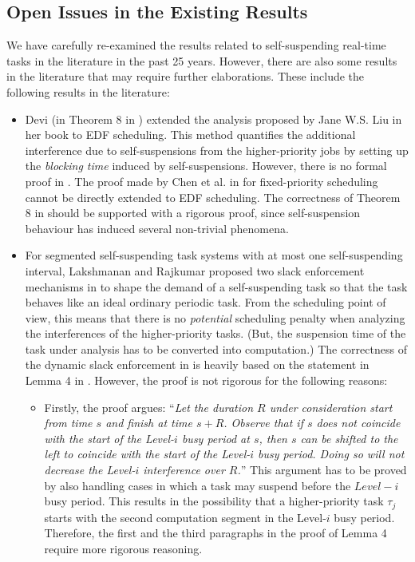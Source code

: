 \subsection{Open Issues in the Existing Results}
\label{sec:open-issues-existing}  
We have carefully re-examined the results related to self-suspending
real-time tasks in the literature in the past 25 years. However, there
are also some results in the literature that may require further
elaborations. These include the following results in the literature:
\begin{itemize}
\item Devi (in Theorem 8 in \cite[Section
  4.5]{DBLP:conf/ecrts/Devi03}) extended the analysis proposed by Jane
  W.S. Liu in her book \cite[Page 164-165]{Liu:2000:RS:518501} to
  EDF scheduling. This method quantifies the additional interference
  due to self-suspensions from the higher-priority jobs by setting up
  the \emph{blocking time} induced by self-suspensions. However, there
  is no formal proof in \cite{DBLP:conf/ecrts/Devi03}. The proof made
  by Chen et al. in \cite{ChenHuangNelissen} for fixed-priority
  scheduling cannot be directly extended to EDF scheduling. The
  correctness of Theorem 8 in \cite[Section
  4.5]{DBLP:conf/ecrts/Devi03} should be supported with a rigorous
  proof, since self-suspension behaviour has induced several
  non-trivial phenomena.

\item For segmented self-suspending task systems with at most one
  self-suspending interval, Lakshmanan and Rajkumar proposed two slack
  enforcement mechanisms in \cite{LR:rtas10} to shape the demand of a
  self-suspending task so that the task behaves like an ideal ordinary
  periodic
  task.  From the scheduling point of view, this means that there is
  no \emph{potential} scheduling penalty when analyzing the interferences of the
  higher-priority tasks. (But, the suspension time of the task under
  analysis has to be converted into computation.) The correctness of the dynamic slack
  enforcement in \cite{LR:rtas10} is heavily based on the statement in Lemma
  4 in \cite{LR:rtas10}. However, the proof is not rigorous for the
  following reasons:
  \begin{itemize}
  \item Firstly, the proof argues: ``\emph{Let the duration $R$ under
    consideration start from time $s$ and finish at time $s +
    R$. Observe that if $s$ does not coincide with the start of the
    Level-$i$ busy period at $s$, then $s$ can be shifted to the left
    to coincide with the start of the Level-$i$ busy period. Doing so
    will not decrease the Level-$i$ interference over $R$.}'' This
    argument has to be proved by also handling cases in which a task
    may suspend before the $Level-i$ busy period. This results in the
    possibility that a higher-priority task $\tau_j$ starts with the
    second computation segment in the Level-$i$ busy
    period. Therefore, the first and the third paragraphs in the proof
    of Lemma 4 \cite{LR:rtas10} require more rigorous reasoning.


\end{itemize}
\end{itemize}
